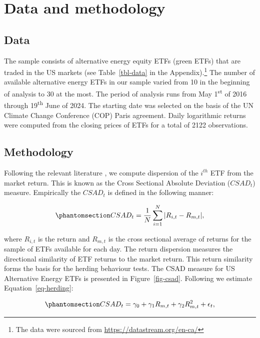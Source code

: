 \documentclass[
  letterpaper,
  DIV=11,
  numbers=noendperiod]{scrartcl}
\begin{document}
\section{Data and methodology}\label{data-and-methodology}

\subsection{Data}\label{data}

The sample consists of alternative energy equity ETFs (green ETFs) that
are traded in the US markets (see Table~\ref{tbl-data} in the
Appendix).\footnote{The data were sourced from
  \url{https://datastream.org/en-ca/}} The number of available
alternative energy ETFs in our sample varied from 10 in the beginning of
analysis to 30 at the most. The period of analysis runs from May
1\textsuperscript{st} of 2016 through 19\textsuperscript{th} June of
2024. The starting date was selected on the basis of the UN Climate
Change Conference (COP) Paris agreement. Daily logarithmic returns were
computed from the closing prices of ETFs for a total of 2122
observations.

\subsection{Methodology}\label{methodology}

Following the relevant literature
\citetext{\citealp{christie1995}; \citealp[and][]{chang2000}}, we
compute dispersion of the \(i^{th}\) ETF from the market return. This is
known as the Cross Sectional Absolute Deviation (\(CSAD_t\)) measure.
Empirically the \(CSAD_t\) is defined in the following manner:

\begin{equation}\phantomsection\label{eq-csad}{
CSAD_t = \dfrac{1}{N}\sum_{i=1}^{N} |R_{i,t} - R_{m,t}|,
}\end{equation}

where \(R_{i,t}\) is the return and \(R_{m,t}\) is the cross sectional
average of returns for the sample of ETFs available for each day. The
return dispersion measures the directional similarity of ETF returns to
the market return. This return similarity forms the basis for the
herding behaviour tests. The CSAD measure for US Alternative Energy ETFs
is presented in Figure~\ref{fig-csad}. Following \citet{galariotis2015}
we estimate Equation~\ref{eq-herding}:

\begin{equation}\phantomsection\label{eq-herding}{
CSAD_t = \gamma_0 + \gamma_1 R_{m,t} + \gamma_2 R_{m,t}^2 + \epsilon_t,
}\end{equation}
\end{document}
